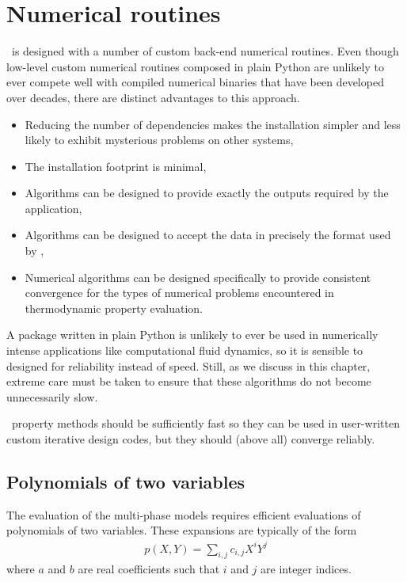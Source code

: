\chapter{Numerical routines}\label{ch:num}

\PM\ is designed with a number of custom back-end numerical routines.  Even though low-level custom numerical routines composed in plain Python are unlikely to ever compete well with compiled numerical binaries that have been developed over decades, there are distinct advantages to this approach.
\begin{itemize}
\item Reducing the number of dependencies makes the installation simpler and less likely to exhibit mysterious problems on other systems,
\item The installation footprint is minimal,
\item Algorithms can be designed to provide exactly the outputs required by the application,
\item Algorithms can be designed to accept the data in precisely the format used by \PM,
\item Numerical algorithms can be designed specifically to provide consistent convergence for the types of numerical problems encountered in thermodynamic property evaluation.
\end{itemize}

A package written in plain Python is unlikely to ever be used in numerically intense applications like computational fluid dynamics, so it is sensible to designed for reliability instead of speed.  Still, as we discuss in this chapter, extreme care must be taken to ensure that these algorithms do not become unnecessarily slow.  

\PM\ property methods should be sufficiently fast so they can be used in user-written custom iterative design codes, but they should (above all) converge reliably.

%
%
\section{Polynomials of two variables}\label{sec:mp1:poly2}
The evaluation of the multi-phase models requires efficient evaluations of polynomials of two variables.  These expansions are typically of the form
\begin{align}
p(X,Y) = \sum_{i,j} c_{i,j} X^i Y^j\label{eqn:general}
\end{align}
where $a$ and $b$ are real coefficients such that $i$ and $j$ are integer indices. 

